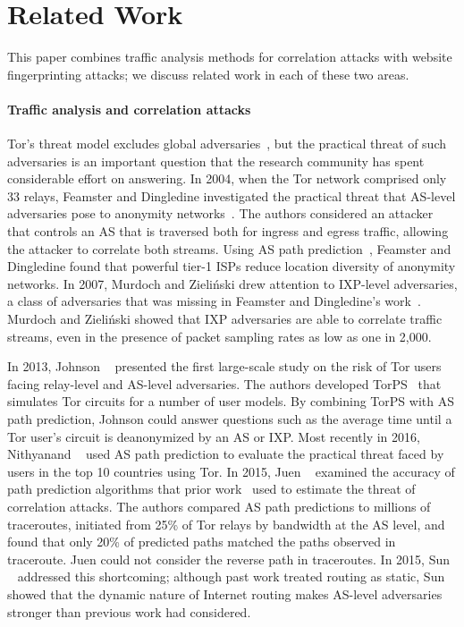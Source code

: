 \section{Related Work}
\label{sec:related_work}

This paper combines traffic analysis methods for correlation attacks
with website fingerprinting attacks; we discuss related work in each of
these two areas.

\paragraph{Traffic analysis and correlation attacks}
Tor's threat model excludes global adversaries~\cite{dingledine2004a}, but the
practical threat of such adversaries is an important question that the
research community has
spent considerable effort on answering.  In 2004, when the Tor network comprised
only 33 relays, Feamster and Dingledine investigated the practical threat that
AS-level adversaries pose to anonymity networks~\cite{Feamster2004a}.
The authors considered an attacker that controls an AS
that is traversed both for ingress and egress traffic, allowing the
attacker to correlate both streams.  Using AS path prediction~\cite{Gao2001a},
Feamster and Dingledine found that powerful tier-1 ISPs reduce location
diversity of anonymity networks.  In 2007, Murdoch and Zieli\'{n}ski drew
attention to IXP-level adversaries, a class of adversaries that was missing in
Feamster and Dingledine's work~\cite{Murdoch2007a}.  Murdoch and Zieli\'{n}ski
showed that IXP adversaries are able to correlate traffic streams, even in the
presence of packet sampling rates as low as one in 2,000.

In 2013, Johnson
\ea~\cite{Johnson2013a} presented the first large-scale study on the risk of Tor
users facing relay-level and AS-level adversaries.  The authors developed
TorPS~\cite{TorPS} that simulates Tor circuits for a number
of user models.  By combining TorPS with AS path
prediction, Johnson \ea could answer questions such as the average time until a
Tor user's circuit is deanonymized by an AS or IXP.  Most recently in 2016,
Nithyanand \ea~\cite{Nithyanand2016a} used AS path prediction to evaluate the
practical threat faced by users in the top 10 countries using Tor.  In 2015,
Juen \ea~\cite{Juen2015a} examined the accuracy of path prediction algorithms
that prior work~\cite{Johnson2013a,Feamster2004a} used to estimate the threat of
correlation attacks.  The authors compared AS path predictions to millions of
traceroutes, initiated from 25\% of Tor relays by bandwidth at the
AS level, and found that
only 20\% of predicted paths matched the paths observed in traceroute.
Juen \ea could not consider the reverse path in traceroutes.  In 2015,
Sun \ea~\cite{Sun2015a} addressed this shortcoming; although past work treated
routing as static, Sun \ea showed that the dynamic nature of Internet
routing makes AS-level adversaries stronger than previous work had considered.

